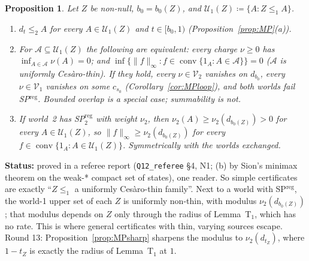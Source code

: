 \documentclass[11pt]{article}
\newtheorem{proposition}[theorem]{Proposition}
\theoremstyle{definition}
\theoremstyle{remark}
\newcommand{\co}{\operatorname{conv}}
\newcommand{\src}[1]{\texttt{#1}}
\newcommand{\status}[1]{\par\smallskip\noindent\textbf{Status:} #1\par\smallskip}
\begin{document}
\begin{proposition}\label{prop:N1}
Let $Z$ be non-null, $b_0=b_0(Z)$, and $\mathcal U_1(Z)\coloneqq\{A:Z\le_1A\}$.
\begin{enumerate}[leftmargin=*,label=(\alph*)]
\item $d_t\le_2A$ for every $A\in\mathcal U_1(Z)$ and $t\in[b_0,1)$ (Proposition~\ref{prop:MP}(a)).
\item For $\mathcal A\subseteq\mathcal U_1(Z)$ the following are equivalent: every charge $\nu\ge0$ has $\inf_{A\in\mathcal A}\nu(A)=0$; and $\inf\{\|f\|_\infty:f\in\co\{1_A:A\in\mathcal A\}\}=0$ (\emph{$\mathcal A$ is uniformly Ces\`aro-thin}). If they hold, every $\nu\in\mathcal V_2$ vanishes on $d_{b_0}$, every $\nu\in\mathcal V_1$ vanishes on some $c_{s_0}$ (Corollary~\ref{cor:MPloop}), and both worlds fail SP$^{\mathrm{reg}}$. Bounded overlap is a special case; summability is not.
\item If world~2 has SP$^{\mathrm{reg}}_2$ with weight $\nu_2$, then $\nu_2(A)\ge\nu_2(d_{b_0(Z)})>0$ for every $A\in\mathcal U_1(Z)$, so $\|f\|_\infty\ge\nu_2(d_{b_0(Z)})$ for every $f\in\co\{1_A:A\in\mathcal U_1(Z)\}$. Symmetrically with the worlds exchanged.
\end{enumerate}
\end{proposition}
\status{proved in a referee report (\src{Q12\_referee} \S4, N1; (b) by Sion's minimax theorem on the weak-* compact set of states), one reader. So simple certificates are exactly ``$Z\le_1$ a uniformly Ces\`aro-thin family''. Next to a world with SP$^{\mathrm{reg}}$, the world-1 upper set of each $Z$ is uniformly non-thin, with modulus $\nu_2(d_{b_0(Z)})$; that modulus depends on $Z$ only through the radius of Lemma~T$_1$, which has no rate. This is where general certificates with thin, varying sources escape. Round 13: Proposition~\ref{prop:MPsharp} sharpens the modulus to $\nu_2(d_{t_Z})$, where $1-t_Z$ is exactly the radius of Lemma~T$_1$ at $1$.}
\end{document}
